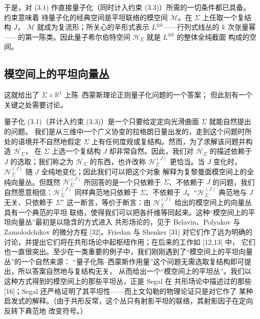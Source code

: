 \documentclass[11pt,a4paper]{article}
\begin{document}
于是，对 (3.1) 作直接量子化（同时计入约束 (3.3)）所需的一切条件都已具备。约束意味着
待量子化的经典空间是平坦联络的模空间 $\mathcal{M}$。在 $\Sigma$ 上任取一个复结构 $J$，
$\mathcal{M}$ 就成为复流形；所关心的辛形式表示 $L^{\otimes k}$——行列式线丛的 $k$ 次张量幂
——的第一陈类。因此量子希尔伯特空间 $\mathcal{H}_\Sigma$ 就是 $L^{\otimes k}$ 的整体全纯截面
构成的空间。

\subsection{模空间上的平坦向量丛}

这就给出了 $\Sigma\times\mathbb{R}^1$ 上陈–西蒙斯理论正则量子化问题的一个答案；
但此刻有一个关键之处需要讨论。

量子化 (3.1)（并计入约束 (3.3)）是一个只要给定定向光滑曲面 $\Sigma$ 就能自然提出的问题。
我们是从三维中一个广义协变的拉格朗日量出发的，走到这个问题时所处的语境并不自然地假定
$\Sigma$ 上有任何度规或复结构。然而，为了求解该问题并构造 $\mathcal{H}_\Sigma$，
在 $\Sigma$ 上选一个复结构 $J$ 却非常自然。因此，我们对 $\mathcal{H}_\Sigma$ 的描述依赖于
$J$ 的选取；我们称之为 $\mathcal{H}_\Sigma$ 的东西，也许改称 $\mathcal{H}_\Sigma^{(J)}$
更恰当。当 $J$ 变化时，$\mathcal{H}_\Sigma^{(J)}$ 随 $J$ 全纯地变化；因此我们可以把这个对象
解释为复黎曼面模空间上的全纯向量丛。但既然 $\mathcal{H}_\Sigma^{(J)}$ 所回答的是一个只依赖于
$\Sigma$、不依赖于 $J$ 的问题，我们自然愿意相信：$\mathcal{H}_\Sigma^{(J)}$ 同样典范地只依赖于
$\Sigma$、不依赖于 $J$。“$\mathcal{H}_\Sigma^{(J)}$ 典范地与 $J$ 无关、只依赖于 $\Sigma$”
这一断言，等价于断言：由 $\mathcal{H}_\Sigma^{(J)}$ 给出的模空间上的向量丛具有一个典范的平坦
联络，使得我们可以把各纤维等同起来。这种“模空间上的平坦向量丛”最初是以隐含的方式进入
共形场论的，见于 Belavin、Polyakov 与 Zamolodchikov 的微分方程 [32]。Friedan 与 Shenker [31]
对它们作了远为明确的讨论，并提出它们将在共形场论中起枢纽作用；在后来的工作如 [12,13] 中，
它们也一直很突出。至少在一类重要的例子中，我们刚刚遇到了“模空间上的平坦向量丛”的一个自然来源：
“量子化陈–西蒙斯作用量”这个问题无需选取复结构即可提出，所以答案自然地与复结构无关，
从而给出一个“模空间上的平坦丛”。我们以这种方式得到的模空间上的那些平坦丛，正是 Segal 在
共形场论中描述过的那些 [16]；Segal 还严格证明了其平坦性——而上文勾勒的物理论证只是对它作了
某种启发式的解释。（由于共形反常，这个丛只有射影平坦的联络，其射影因子在定向反转下典范地
改变符号。）

\end{document}
